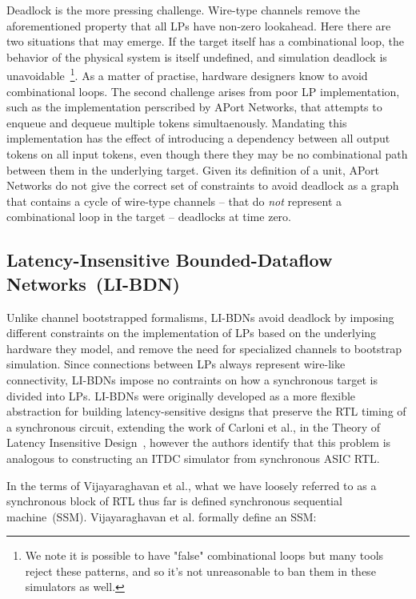 Deadlock is the more pressing challenge. Wire-type channels remove the
aforementioned property that all LPs have non-zero lookahead.  Here there are
two situations that may emerge. If the target itself has a combinational loop,
the behavior of the physical system is itself undefined, and simulation
deadlock is unavoidable~\footnote{We note it is possible to have "false"
combinational loops but many tools reject these patterns, and so it's not
unreasonable to ban them in these simulators as well.}. As a matter of
practise, hardware designers know to avoid combinational loops. The second
challenge arises from poor LP implementation, such as the implementation perscribed by
APort Networks, that attempts to enqueue and dequeue multiple tokens
simultaenously. Mandating this implementation has the effect of introducing a
dependency between all output tokens on all input tokens, even though there
they may be no combinational path between them in
the underlying target. Given its definition of a unit, APort Networks do not
give the correct set of constraints to avoid deadlock as a graph that contains
a cycle of wire-type channels -- that do \emph{not} represent a combinational loop in
the target -- deadlocks at time zero.


\subsection{Latency-Insensitive Bounded-Dataflow Networks~(LI-BDN)}

Unlike channel bootstrapped formalisms, LI-BDNs avoid deadlock by imposing
different constraints on the implementation of LPs based on the underlying
hardware they model, and remove the need for specialized channels to bootstrap
simulation. Since connections between LPs always represent wire-like
connectivity, LI-BDNs impose no contraints on how a synchronous target
is divided into LPs. LI-BDNs were originally developed as a more flexible abstraction for building
latency-sensitive designs that preserve the RTL timing of a synchronous circuit, extending
the work of Carloni et al., in the Theory of Latency Insensitive Design~\cite{TheoryOfLIDesign}, however the authors identify that this problem is analogous
to constructing an ITDC simulator from synchronous ASIC RTL.

In the terms of Vijayaraghavan et al.\cite{LIBDN}, what we have loosely referred to as a synchronous
block of RTL thus far is defined synchronous sequential machine~(SSM). Vijayaraghavan et
al.\cite{LIBDN} formally define an SSM:

